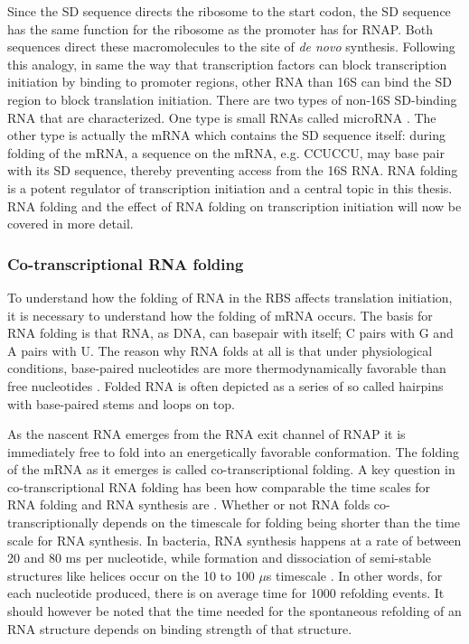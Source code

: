 Since the SD sequence directs the ribosome to the start codon, the SD sequence
has the same function for the ribosome as the promoter has for RNAP. Both
sequences direct these macromolecules to the site of \textit{de novo}
synthesis. Following this analogy, in same the way that transcription factors
can block transcription initiation by binding to promoter regions, other RNA
than 16S can bind the SD region to block translation initiation. There are two
types of non-16S SD-binding RNA that are characterized. One type is small RNAs
called microRNA \cite{storz_controlling_2004}. The other type is actually the
mRNA which contains the SD sequence itself: during folding of the mRNA, a
sequence on the mRNA, e.g. CCUCCU, may base pair with its SD sequence, thereby
preventing access from the 16S RNA. RNA folding is a potent regulator of
transcription initiation \cite{hall_role_1982, de_smit_secondary_1990} and a
central topic in this thesis. RNA folding and the effect of RNA folding on
transcription initiation will now be covered in more detail.

\subsubsection{Co-transcriptional RNA folding}
To understand how the folding of RNA in the RBS affects translation initiation,
it is necessary to understand how the folding of mRNA occurs. The basis for RNA
folding is that RNA, as DNA, can basepair with itself; C pairs with G and A
pairs with U. The reason why RNA folds at all is that under physiological
conditions, base-paired nucleotides are more thermodynamically favorable than
free nucleotides \cite{onoa_rna_2004}. Folded RNA is often depicted as a series
of so called hairpins with base-paired stems and loops on top.

As the nascent RNA emerges from the RNA exit channel of RNAP it is immediately
free to fold into an energetically favorable conformation. The folding of the
mRNA as it emerges is called co-transcriptional folding. A key question in
co-transcriptional RNA folding has been how comparable the time scales for RNA
folding and RNA synthesis are \cite{de_smit_translational_2003}. Whether or
not RNA folds co-transcriptionally depends on the timescale for folding being
shorter than the time scale for RNA synthesis. In bacteria, RNA synthesis
happens at a rate of between 20 and 80 ms per nucleotide, while formation and
dissociation of semi-stable structures like helices occur on the 10 to 100
$\mu$s timescale \cite{isambert_jerky_2009}. In other words, for each
nucleotide produced, there is on average time for 1000 refolding events. It
should however be noted that the time needed for the spontaneous refolding of
an RNA structure depends on binding strength of that structure.

